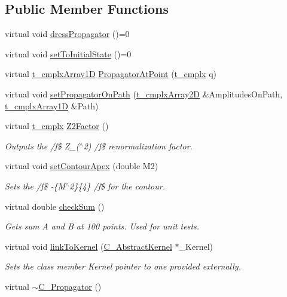\subsection*{Public Member Functions}
\begin{DoxyCompactItemize}
\item 
virtual void \hyperlink{class_c___propagator_a4b82db59060878e794c3590ee3fbc3f1}{dress\-Propagator} ()=0
\item 
virtual void \hyperlink{class_c___propagator_a2efb521f2afd9ad94c07f62db1d03b8b}{set\-To\-Initial\-State} ()=0
\item 
virtual \hyperlink{types_8h_aab52f79903881ec15d289b3dbfb102fd}{t\-\_\-cmplx\-Array1\-D} \hyperlink{class_c___propagator_a7bf057f408c2a30667fffea12d1375ba}{Propagator\-At\-Point} (\hyperlink{types_8h_aa75ae339052372f671bb263e6a272e82}{t\-\_\-cmplx} q)
\item 
virtual void \hyperlink{class_c___propagator_a8f555dfead878b17db05cc679b7ce9aa}{set\-Propagator\-On\-Path} (\hyperlink{types_8h_a4db8c78f1689c3a957b2866daaae58f2}{t\-\_\-cmplx\-Array2\-D} \&Amplitudes\-On\-Path, \hyperlink{types_8h_aab52f79903881ec15d289b3dbfb102fd}{t\-\_\-cmplx\-Array1\-D} \&Path)
\item 
virtual \hyperlink{types_8h_aa75ae339052372f671bb263e6a272e82}{t\-\_\-cmplx} \hyperlink{class_c___propagator_ad875936f27fc648f9681f5e18286425a}{Z2\-Factor} ()
\begin{DoxyCompactList}\small\item\em Outputs the /f\$ Z\-\_($^\wedge$2) /f\$ renormalization factor. \end{DoxyCompactList}\item 
virtual void \hyperlink{class_c___propagator_ac607b22d1dbb5c947606182b36acab54}{set\-Contour\-Apex} (double M2)
\begin{DoxyCompactList}\small\item\em Sets the /f\$ -\/\{M$^\wedge$2\}\{4\} /f\$ for the contour. \end{DoxyCompactList}\item 
virtual double \hyperlink{class_c___propagator_a6b49ff6bc2a98001966e987dc7d9230a}{check\-Sum} ()
\begin{DoxyCompactList}\small\item\em Gets sum A and B at 100 points. Used for unit tests. \end{DoxyCompactList}\item 
virtual void \hyperlink{class_c___propagator_ae4c299d0b4ab2bf2b5c101153062949d}{link\-To\-Kernel} (\hyperlink{class_c___abstract_kernel}{C\-\_\-\-Abstract\-Kernel} $\ast$\-\_\-\-Kernel)
\begin{DoxyCompactList}\small\item\em Sets the class member Kernel pointer to one provided externally. \end{DoxyCompactList}\item 
virtual \hyperlink{class_c___propagator_a4a3a1b4a06e8a393bda0973634915317}{$\sim$\-C\-\_\-\-Propagator} ()
\end{DoxyCompactItemize}
